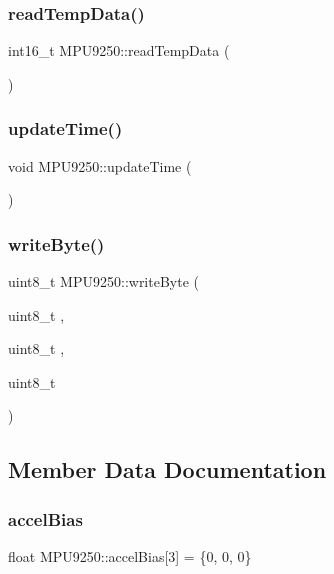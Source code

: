 \subsubsection{\texorpdfstring{read\+Temp\+Data()}{readTempData()}}
{\footnotesize\ttfamily int16\+\_\+t M\+P\+U9250\+::read\+Temp\+Data (\begin{DoxyParamCaption}{ }\end{DoxyParamCaption})}

\mbox{\label{classMPU9250_a39e17cffe3de219d3f991b6476833e40}} 
\subsubsection{\texorpdfstring{update\+Time()}{updateTime()}}
{\footnotesize\ttfamily void M\+P\+U9250\+::update\+Time (\begin{DoxyParamCaption}{ }\end{DoxyParamCaption})}

\mbox{\label{classMPU9250_a136cd20820be776769c6214640c4130e}} 
\subsubsection{\texorpdfstring{write\+Byte()}{writeByte()}}
{\footnotesize\ttfamily uint8\+\_\+t M\+P\+U9250\+::write\+Byte (\begin{DoxyParamCaption}\item[{uint8\+\_\+t}]{,  }\item[{uint8\+\_\+t}]{,  }\item[{uint8\+\_\+t}]{ }\end{DoxyParamCaption})}



\subsection{Member Data Documentation}
\mbox{\label{classMPU9250_a7b0e6389baccd5592c95cae9d24d1317}} 
\subsubsection{\texorpdfstring{accel\+Bias}{accelBias}}
{\footnotesize\ttfamily float M\+P\+U9250\+::accel\+Bias\mbox{[}3\mbox{]} = \{0, 0, 0\}}



